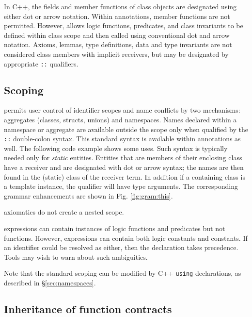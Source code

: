 In C++, the fields and member functions of class objects are designated using 
either dot or arrow notation. Within \NAME annotations, \lang member functions are not
permitted. However, \NAME allows logic functions, predicates, and class invariants to be defined
within class scope and then called using conventional \lang dot and arrow notation.
Axioms, lemmas, type definitions, data and type invariants are not considered class members with implicit receivers,
but may be designated by appropriate \lstinline|::| qualifiers.

\subsection{Scoping}

\lang permits user control of identifier scopes and name conflicts by two mechanisms: aggregates (classes, structs, unions)  and namespaces. 
Names declared within a namespace or aggregate are available outside the scope only when qualified by the
\lstinline|::| double-colon syntax. This standard \lang syntax is available within \NAME annotations as well.
The following code example shows some uses. Such syntax is typically needed only for \textit{static} entities.
Entities that are members of their enclosing class have a receiver and are designated with dot or arrow syntax;
the names are then found in the (static) class of the receiver term. In addition if a containing class is a template
instance, the qualifier will have type arguments. The corresponding grammar enhancements are shown in Fig. \ref{fig:gram:this}.



\NAME axiomatics do not create a nested scope.

\NAME expressions can contain instances of logic functions and predicates but not \lang functions. However, \NAME expressions can contain both logic constants
and \lang constants. If an identifier could be resolved as either, then the
\lang declaration takes precedence. Tools may wish to warn about such
ambiguities.

Note that the standard scoping can be modified by C++ \lstinline|using| declarations, as described in \S\ref{sec:namespaces}.


\subsection{Inheritance of function contracts}

